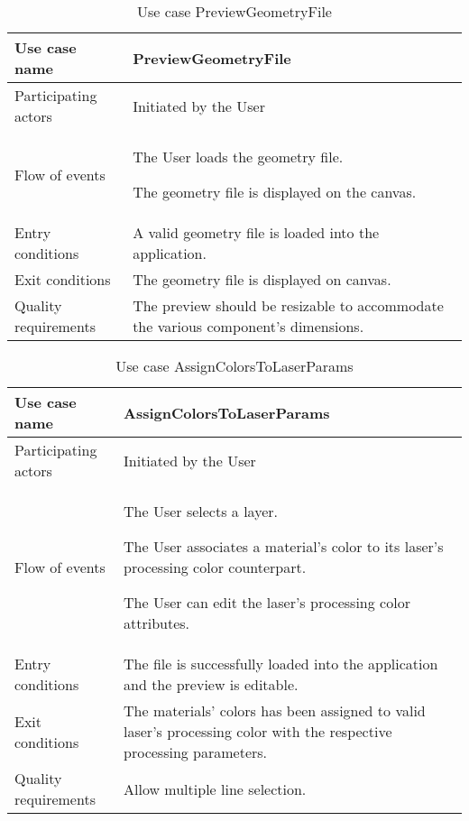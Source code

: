 \begin{table}
  \captionsetup{justification=raggedright, singlelinecheck=false}
  \caption{Use case PreviewGeometryFile}
  \centering
  \begin{tabular}{p{}p{}}
    \hline
    Use case name & \textbf{PreviewGeometryFile} \\ \hline
     Participating actors      & Initiated by the User \\ \hline
     Flow of events & \begin{enum-c}
     \item The User loads the geometry file.
     \item The geometry file is displayed on the canvas.
     \end{enum-c}\\ \hline 
     Entry conditions       & A valid geometry file is loaded into the
     application. \\ \hline 
      Exit conditions & The geometry file is displayed on canvas.      \\ \hline 
      Quality requirements & The preview should be resizable to accommodate
      the various component's dimensions. \\ \hline 
  \end{tabular}
\label{tab:us-prev-geom}
\end{table}

\begin{table}
  \captionsetup{justification=raggedright, singlelinecheck=false}
  \caption{Use case AssignColorsToLaserParams}
  \centering
  \begin{tabular}{p{}p{}}
    \hline
    Use case name & \textbf{AssignColorsToLaserParams} \\ \hline
     Participating actors      & Initiated by the User \\ \hline
     Flow of events & \begin{enum-c}
     \item The User selects a layer.
     \item The User associates a material's color to its laser's processing color
       counterpart.
     \item The User can edit the laser's processing color attributes.
     \end{enum-c}\\ \hline 
     Entry conditions       & The file is successfully loaded into the
     application and the preview is editable. \\ \hline 
      Exit conditions & The materials' colors has been assigned to valid laser's
      processing color with the respective processing parameters.\\ \hline 
      Quality requirements & Allow multiple line selection. \\ \hline 
  \end{tabular}
\label{tab:us-assign-colors}
\end{table}

